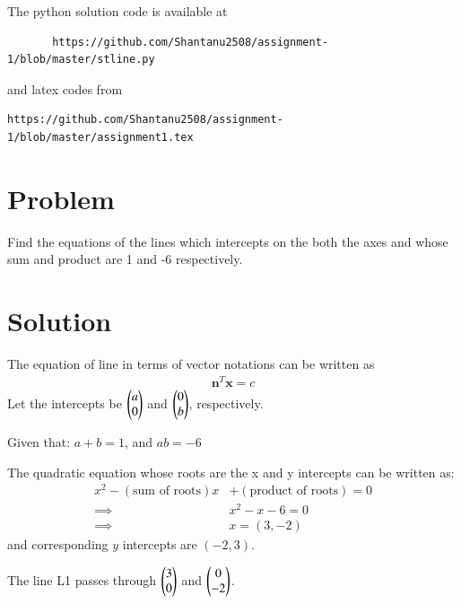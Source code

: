 \documentclass[journal,12pt,twocolumn]{IEEEtran}
\begin{document}
The python solution code is available at
\begin{lstlisting}
       https://github.com/Shantanu2508/assignment-1/blob/master/stline.py
\end{lstlisting}
%
and latex codes from 
\begin{lstlisting}
https://github.com/Shantanu2508/assignment-1/blob/master/assignment1.tex
\end{lstlisting}
%
\section{Problem}
Find the equations of the lines which intercepts on the both the axes and whose
	sum and product are 1 and -6 respectively.

\section{Solution}
	The equation of line in terms of vector notations can be written as
\begin{align}
	{\mathbf{n}^T}{\mathbf x} = c  
\end{align}
Let the intercepts be $\begin{pmatrix}a \\ 0\end{pmatrix}$ and $\begin{pmatrix}0 \\ b\end{pmatrix}$, respectively.

\noindent
	Given that: \quad $ a + b = 1 $, \quad and \quad $ ab = -6$ 

The quadratic equation whose roots are the x and y intercepts can be written as:
\begin{align}
	x^2 - (\text{sum of roots})x &+ (\text{product of roots}) = 0 \\
	\implies \qquad & x^2 - x -6 =0 \\
	\implies \qquad & x=(3,-2) 
\end{align}
and corresponding $y$ intercepts are $(-2,3)$. 

\noindent
The line L1 passes through $\begin{pmatrix}3 \\ 0\end{pmatrix}$ and $\begin{pmatrix}0 \\ -2\end{pmatrix}$.
\end{document}
